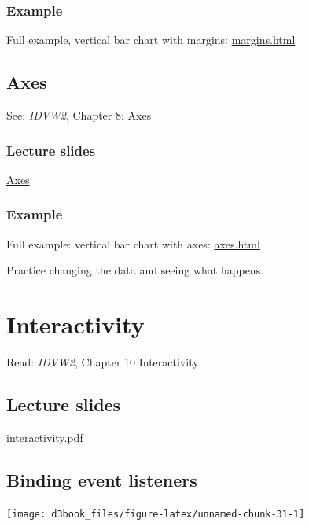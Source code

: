 \documentclass[openany]{book}
\begin{document}
\hypertarget{example}{%
\subsection{Example}\label{example}}

Full example, vertical bar chart with margins: \href{code/margins.html}{margins.html}

\hypertarget{axes}{%
\section{Axes}\label{axes}}

See: \emph{IDVW2}, Chapter 8: Axes

\hypertarget{lecture-slides-3}{%
\subsection{Lecture slides }\label{lecture-slides-3}}

\href{pdfs/axes.pdf}{Axes}

\hypertarget{example-1}{%
\subsection{Example}\label{example-1}}

Full example: vertical bar chart with axes: \href{code/axes.html}{axes.html}

Practice changing the data and seeing what happens.

\hypertarget{interactivity}{%
\chapter{Interactivity }\label{interactivity}}

Read: \emph{IDVW2}, Chapter 10 Interactivity

\hypertarget{lecture-slides-4}{%
\section{Lecture slides }\label{lecture-slides-4}}

\href{pdfs/interactivity.pdf}{interactivity.pdf}

\hypertarget{binding-event-listeners}{%
\section{Binding event listeners}\label{binding-event-listeners}}

\begin{center}\texttt{[image: d3book\_files/figure-latex/unnamed-chunk-31-1]} \end{center}
\end{document}
